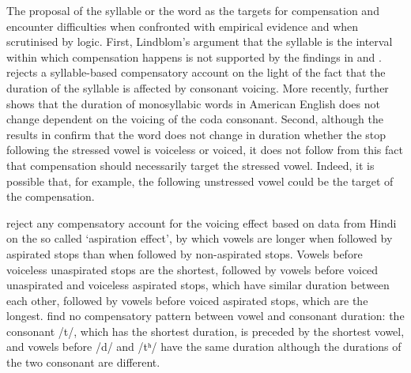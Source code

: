 \documentclass[preprint]{JASAnew}
\begin{document}
The proposal of the syllable or the word as the targets for compensation
and encounter difficulties when confronted with empirical evidence and
when scrutinised by logic. First, Lindblom's \citeyearpar{lindblom1967}
argument that the syllable is the interval within which compensation
happens is not supported by the findings in \citet{chen1970} and
\citet{jacewicz2009}. \citet{chen1970} rejects a syllable-based
compensatory account on the light of the fact that the duration of the
syllable is affected by consonant voicing. More recently,
\citet{jacewicz2009} further shows that the duration of monosyllabic
words in American English does not change dependent on the voicing of
the coda consonant. Second, although the results in \citet{slis1969}
confirm that the word does not change in duration whether the stop
following the stressed vowel is voiceless or voiced, it does not follow
from this fact that compensation should necessarily target the stressed
vowel. Indeed, it is possible that, for example, the following
unstressed vowel could be the target of the compensation.

\citet{maddieson1976} reject any compensatory account for the voicing
effect based on data from Hindi on the so called `aspiration effect', by
which vowels are longer when followed by aspirated stops than when
followed by non-aspirated stops. Vowels before voiceless unaspirated
stops are the shortest, followed by vowels before voiced unaspirated and
voiceless aspirated stops, which have similar duration between each
other, followed by vowels before voiced aspirated stops, which are the
longest. \citet{maddieson1976} find no compensatory pattern between
vowel and consonant duration: the consonant /t/, which has the shortest
duration, is preceded by the shortest vowel, and vowels before /d/ and
/tʰ/ have the same duration although the durations of the two consonant
are different.
\end{document}
